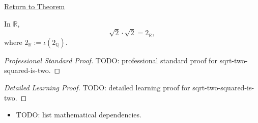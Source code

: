 \newpage
{}
\label{prf:sqrt-two-squared-is-two}

\begin{remark*}[Return]
\hyperref[thm:sqrt-two-squared-is-two]{Return to Theorem}
\end{remark*}

\begin{theorem*}
In $\mathbb{R}$,
\[
\sqrt{2}\cdot\sqrt{2}=2_{\mathbb{R}},
\]
where $2_{\mathbb{R}}:=\iota(2_{\mathbb{Q}})$.
\end{theorem*}

\begin{proof}[Professional Standard Proof]
\LRAProofBodyStart
TODO: professional standard proof for sqrt-two-squared-is-two.
\end{proof}

\begin{proof}[Detailed Learning Proof]
\LRAProofBodyStart
TODO: detailed learning proof for sqrt-two-squared-is-two.
\end{proof}

\begin{remark*}
\end{remark*}

\begin{dependencies}
\begin{itemize}
  \item TODO: list mathematical dependencies.
\end{itemize}
\end{dependencies}

\clearpage
